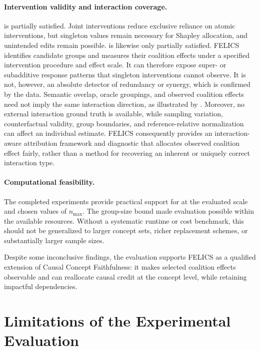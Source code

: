 \paragraph{Intervention validity and interaction coverage.}
 is partially satisfied. Joint interventions reduce exclusive reliance on atomic interventions, but singleton values remain necessary for Shapley allocation, and unintended edits remain possible.  is likewise only partially satisfied. FELICS identifies candidate groups and measures their coalition effects under a specified intervention procedure and effect scale. It can therefore expose super- or subadditive response patterns that singleton interventions cannot observe. It is not, however, an absolute detector of redundancy or synergy, which is confirmed by the data. Semantic overlap, oracle groupings, and observed coalition effects need not imply the same interaction direction, as illustrated by . Moreover, no external interaction ground truth is available, while sampling variation, counterfactual validity, group boundaries, and reference-relative normalization can affect an individual estimate. FELICS consequently provides an interaction-aware attribution framework and diagnostic that allocates observed coalition effect fairly, rather than a method for recovering an inherent or uniquely correct interaction type.

\paragraph{Computational feasibility.}
The completed experiments provide practical support for  at the evaluated scale and chosen values of $n_{\max}$. The group-size bound made evaluation possible within the available resources. Without a systematic runtime or cost benchmark, this should not be generalized to larger concept sets, richer replacement schemes, or substantially larger sample sizes.

Despite some inconclusive findings, the evaluation supports FELICS as a qualified extension of Causal Concept Faithfulness: it makes selected coalition effects observable and can reallocate causal credit at the concept level, while retaining impactful dependencies.

\section{Limitations of the Experimental Evaluation}
\label{sec:experimental_limitations}

